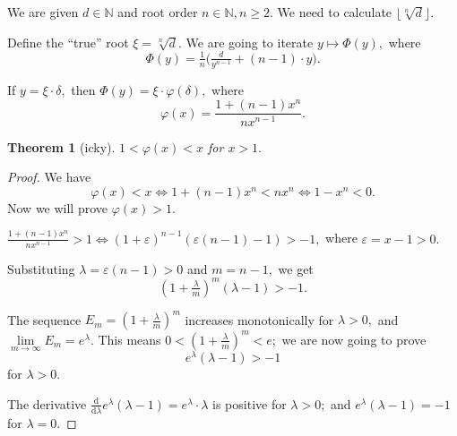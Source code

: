 \documentclass[a4paper,12pt]{article}
\newtheorem{theorem}{Theorem}
\newcommand{\floor}[1] {\lfloor #1 \rfloor}
\begin{document}
We are given $d \in \mathbb{N}$ and root order $n \in \mathbb{N}, n \ge 2.$
We need to calculate $\floor{\sqrt[n]{d}}.$

Define the ``true'' root $\xi = \sqrt[n]{d}.$
We are going to iterate $y \mapsto \Phi(y),$ where
$$\Phi(y) = \tfrac{1}{n} \big( \tfrac{d}{y^{n-1}} + (n-1) \cdot y \big).$$

If $y = \xi \cdot \delta,$ then $\Phi(y) = \xi \cdot \varphi(\delta),$
where $$\varphi(x) = \frac{1 + (n-1)x^n}{n x^{n-1}}.$$

\begin{theorem}[icky]
    $1 < \varphi(x) < x$ for $x > 1.$
\end{theorem}
\begin{proof}

We have
$$\varphi(x) < x \Leftrightarrow 1 + (n-1)x^n < n x^n \Leftrightarrow 1 - x^n < 0.$$
Now we will prove $\varphi(x) > 1.$

$\frac{1 + (n-1)x^n}{n x^{n-1}} > 1 \Leftrightarrow (1 + \varepsilon)^{n-1}(\varepsilon(n-1) - 1) > -1,$
where $\varepsilon = x - 1 > 0.$

Substituting $\lambda = \varepsilon(n-1) > 0$ and $m = n-1,$ we get
$$(1 + \tfrac{\lambda}{m})^m (\lambda - 1) > -1.$$

The sequence $E_m = (1 + \tfrac{\lambda}{m})^m$ increases monotonically for $\lambda > 0,$
and $\lim\limits_{m \to \infty} E_m = e^{\lambda}.$
This means $0 < (1 + \tfrac{\lambda}{m})^m < e;$ we are now going to prove
$$e^{\lambda} (\lambda - 1) > -1$$ for $\lambda > 0.$

The derivative $\frac{\mathrm{d}}{\mathrm{d} \lambda} e^{\lambda}(\lambda - 1) = e^{\lambda} \cdot \lambda$
is positive for $\lambda > 0;$ and $e^\lambda (\lambda - 1) = -1$ for $\lambda = 0.$

\end{proof}
\end{document}

